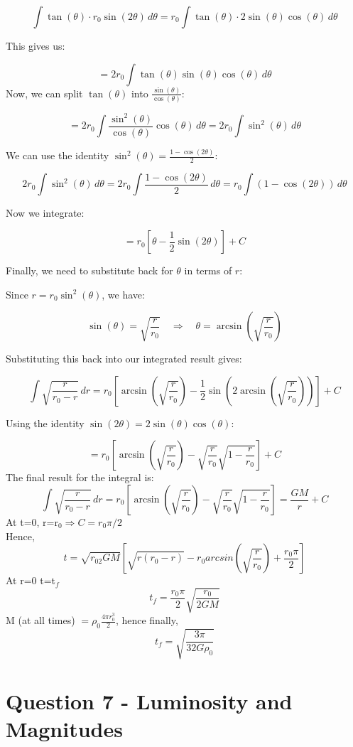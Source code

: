 \documentclass[11pt]{article}
\begin{document}
		\[
		\int \tan(\theta) \cdot r_0 \sin(2\theta) \, d\theta = r_0 \int \tan(\theta) \cdot 2 \sin(\theta) \cos(\theta) \, d\theta
		\]
		
		This gives us:
		
		\[
		= 2r_0 \int \tan(\theta) \sin(\theta) \cos(\theta) \, d\theta
		\]
		Now, we can split \( \tan(\theta) \) into \( \frac{\sin(\theta)}{\cos(\theta)} \):
		
		\[
		= 2r_0 \int \frac{\sin^2(\theta)}{\cos(\theta)} \cos(\theta) \, d\theta = 2r_0 \int \sin^2(\theta) \, d\theta
		\]
		
		We can use the identity \( \sin^2(\theta) = \frac{1 - \cos(2\theta)}{2} \):
		
		\[
		2r_0 \int \sin^2(\theta) \, d\theta = 2r_0 \int \frac{1 - \cos(2\theta)}{2} \, d\theta = r_0 \int (1 - \cos(2\theta)) \, d\theta
		\]
		
		Now we integrate:
		
		\[
		= r_0 \left[ \theta - \frac{1}{2} \sin(2\theta) \right] + C
		\]
		
		Finally, we need to substitute back for \( \theta \) in terms of \( r \):
		
		Since \( r = r_0 \sin^2(\theta) \), we have:
		
		\[
		\sin(\theta) = \sqrt{\frac{r}{r_0}} \quad \Rightarrow \quad \theta = \arcsin\left(\sqrt{\frac{r}{r_0}}\right)
		\]
		
		Substituting this back into our integrated result gives:
		
		\[
		\int \sqrt{\frac{r}{r_0 - r}} \, dr = r_0 \left[ \arcsin\left(\sqrt{\frac{r}{r_0}}\right) - \frac{1}{2} \sin\left(2 \arcsin\left(\sqrt{\frac{r}{r_0}}\right)\right) \right] + C
		\]
		
		Using the identity \( \sin(2\theta) = 2 \sin(\theta) \cos(\theta) \):
		
		\[
		= r_0 \left[ \arcsin\left(\sqrt{\frac{r}{r_0}}\right) - \sqrt{\frac{r}{r_0}} \sqrt{1 - \frac{r}{r_0}} \right] + C
		\]
		The final result for the integral is:
		\[
		\int \sqrt{\frac{r}{r_0 - r}} \, dr = r_0 \left[ \arcsin\left(\sqrt{\frac{r}{r_0}}\right) - \sqrt{\frac{r}{r_0}} \sqrt{1 - \frac{r}{r_0}} \right] = \frac{GM}{r}+ C
		\]
		At t=0, r=r$_0 \Rightarrow C = r_0 \pi/2$\\
		Hence,
		\[
			t = \sqrt{r_02GM}[\sqrt{r(r_0-r)} - r_0 arcsin(\sqrt{\frac{r}{r_0}})+ \frac{r_0\pi}{2}]
		\]
		At r=0 t=t$_f$
		\[
			t_f = \frac{r_0 \pi}{2} \sqrt{\frac{r_0}{2GM}}
		\]
		M (at all times) $= \rho_0\frac{4\pi r_0^3}{2}$, hence finally,
		\[
			t_f = \sqrt{\frac{3\pi}{32G\rho_0}}
		\]
		
		\section{Question 7 - Luminosity and Magnitudes}
		
		
	
\end{document}

